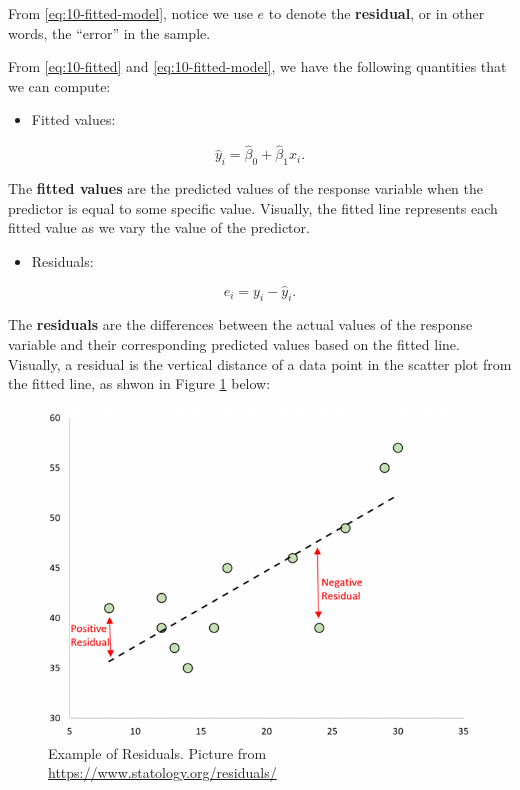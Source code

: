 \documentclass[
]{book}
\providecommand{\tightlist}{%
  \setlength{\itemsep}{0pt}\setlength{\parskip}{0pt}}
\begin{document}
From \eqref{eq:10-fitted-model}, notice we use \(e\) to denote the \textbf{residual}, or in other words, the ``error'' in the sample.

From \eqref{eq:10-fitted} and \eqref{eq:10-fitted-model}, we have the following quantities that we can compute:

\begin{itemize}
\tightlist
\item
  Fitted values:
\end{itemize}

\begin{equation}
\hat{y}_i = \hat{\beta}_0+\hat{\beta}_1 x_i.
\label{eq:10-fits}
\end{equation}

The \textbf{fitted values} are the predicted values of the response variable when the predictor is equal to some specific value. Visually, the fitted line represents each fitted value as we vary the value of the predictor.

\begin{itemize}
\tightlist
\item
  Residuals:
\end{itemize}

\begin{equation} 
e_i = y_i-\hat{y}_i.
\label{eq:10-res}
\end{equation}

The \textbf{residuals} are the differences between the actual values of the response variable and their corresponding predicted values based on the fitted line. Visually, a residual is the vertical distance of a data point in the scatter plot from the fitted line, as shwon in Figure \ref{fig:10-res} below:

\begin{figure}
\centering
\includegraphics{images/10-residuals.png}
\caption{\label{fig:10-res}Example of Residuals. Picture from \url{https://www.statology.org/residuals/}}
\end{figure}
\end{document}
